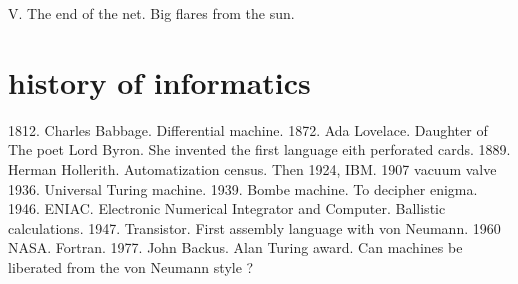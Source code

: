   V. The end of the net. Big flares from the sun. 
  
 
 
 
 
 \section{history of informatics}
 1812. Charles Babbage. Differential machine. 
 1872. Ada Lovelace. Daughter of The poet Lord Byron. She invented the first language eith perforated cards. 
 1889. Herman Hollerith. Automatization census. Then 1924, IBM.
 1907 vacuum valve 
 1936. Universal Turing machine. 
 1939. Bombe machine. To decipher enigma. 
 1946. ENIAC. Electronic Numerical Integrator and Computer. Ballistic calculations. 
 1947. Transistor. First assembly language with von Neumann. 
 1960 NASA. Fortran. 
 1977. John Backus. Alan Turing award. Can machines be liberated from the von Neumann style ? 
 
 